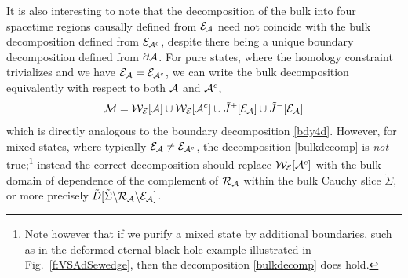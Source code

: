 \documentclass[12pt]{article}
\def\bulkD{{\tilde D}}
\def\bulkJ{{\tilde J}}
\def\bulk{{\cal M}}
\def\regA{{\cal A}}
\def\regAc{{\cal A}^c}
\def\entsurf{
\partial \regA}
\def\extr{{\cal E}_\regA}
\def\homsurfA{{\cal R}_{\regA}}
\def\EWA{{\cal W}_{\cal E}[\regA]}
\def\EWAc{{\cal W}_{\cal E}[\regAc]}
\begin{document}
It is also interesting to note that the decomposition of the bulk into four spacetime regions causally defined from $\extr$ need not coincide with the bulk decomposition defined from ${\cal E}_{\regAc}$, despite there being a unique boundary decomposition defined from $\entsurf$.  For pure states, where the homology constraint trivializes and we have  $\extr = {\cal E}_{\regAc}$, we can write the bulk decomposition equivalently with respect to both $\regA$ and $\regAc$,
%
\begin{equation}
\bulk = \EWA \cup \EWAc \cup \bulkJ^+[\extr] \cup \bulkJ^-[\extr]
\label{bulkdecomp}
\end{equation}	
% 
which is directly analogous to the boundary decomposition \eqref{bdy4d}.  However, for mixed states, where typically $\extr \ne {\cal E}_{\regAc}$, the decomposition \eqref{bulkdecomp} is {\it not} true;\footnote{ Note however that if we purify a mixed state by additional boundaries, such as in the deformed eternal black hole example illustrated in Fig.~\ref{f:VSAdSewedge}, then the decomposition \eqref{bulkdecomp} does hold.} instead the correct decomposition should replace $\EWAc$ with the bulk domain of dependence of the complement of $\homsurfA$ within the bulk Cauchy slice ${\tilde \Sigma}$, or more precisely 
$\bulkD[{\tilde \Sigma} \backslash \homsurfA \backslash \extr]$.
\end{document}
